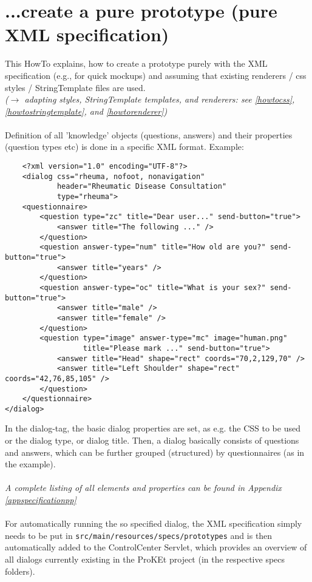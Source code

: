 \documentclass[a4paper,10pt]{scrreprt}
\begin{document}
\section{...create a pure prototype (pure XML specification)} \label{howtopureprototyping}
This HowTo explains, how to create a prototype purely with the XML specification (e.g., for quick mockups) and assuming that existing renderers / css styles / StringTemplate files are used.\\
\textit{($\rightarrow$ adapting styles, StringTemplate templates, and renderers: see \ref{howtocss}, \ref{howtostringtemplate}, and \ref{howtorenderer})} \\\\
Definition of all 'knowledge' objects (questions, answers) and their properties (question types etc) is done in a specific XML format. Example:
\begin{verbatim}
	<?xml version="1.0" encoding="UTF-8"?>
	<dialog css="rheuma, nofoot, nonavigation" 
	        header="Rheumatic Disease Consultation"  
	        type="rheuma">
    <questionnaire>
        <question type="zc" title="Dear user..." send-button="true"> 
            <answer title="The following ..." />
        </question>
        <question answer-type="num" title="How old are you?" send-button="true">
            <answer title="years" />
        </question>
        <question answer-type="oc" title="What is your sex?" send-button="true">
            <answer title="male" />
            <answer title="female" />
        </question>
        <question type="image" answer-type="mc" image="human.png"
                  title="Please mark ..." send-button="true">
            <answer title="Head" shape="rect" coords="70,2,129,70" />
            <answer title="Left Shoulder" shape="rect" coords="42,76,85,105" />
        </question>
    </questionnaire>
</dialog>
\end{verbatim}
In the dialog-tag, the basic dialog properties are set, as e.g. the CSS to be used or the dialog type, or dialog title. Then, a dialog basically consists of questions and answers, which can be further grouped (structured) by questionnaires (as in the example).\\\\
\textit{A complete listing of all elements and properties can be found in Appendix \ref{appspecificationpp}}\\\\
%
For automatically running the so specified dialog, the XML specification simply needs to be put in \texttt{src/main/resources/specs/prototypes} and is then automatically added to the ControlCenter Servlet, which provides an overview of all dialogs currently existing in the ProKEt project (in the respective specs folders).
\end{document}
